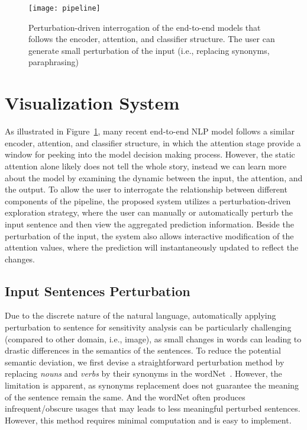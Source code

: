 
\begin{figure}[htbp]
\centering
\vspace{-2mm}
 \texttt{[image: pipeline]}
 \caption{
 Perturbation-driven interrogation of the end-to-end models that follows the encoder, attention, and classifier structure. The user can generate small perturbation of the input (i.e., replacing synonyms, paraphrasing)
 }
\label{fig:modelPipeline}
\end{figure}

\section{Visualization System}
As illustrated in Figure~\ref{fig:modelPipeline}, many recent end-to-end NLP model follows a similar encoder, attention, and classifier structure, in which the attention stage provide a window for peeking into the model decision making process. However, the static attention alone likely does not tell the whole story, instead we can learn more about the model by examining the dynamic between the input, the attention, and the output. To allow the user to interrogate the relationship between different components of the pipeline, the proposed system utilizes a perturbation-driven exploration strategy, where the user can manually or automatically perturb the input sentence and then view the aggregated prediction information. Beside the perturbation of the input, the system also allows interactive modification of the attention values, where the prediction will instantaneously updated to reflect the changes. 
%

\subsection{Input Sentences Perturbation}
\label{sec:perturb}
Due to the discrete nature of the natural language, automatically applying perturbation to sentence for sensitivity analysis can be particularly challenging (compared to other domain, i.e., image), as small changes in words can leading to drastic differences in the semantics of the sentences.
To reduce the potential semantic deviation, we first devise a straightforward perturbation method by replacing \emph{nouns} and \emph{verbs} by their synonyms in the wordNet~\cite{Miller1995}. However, the limitation is apparent, as synonyms replacement does not guarantee the meaning of the sentence remain the same. And the wordNet often produces infrequent/obscure usages that may leads to less meaningful perturbed sentences. However, this method requires minimal computation and is easy to implement. 

